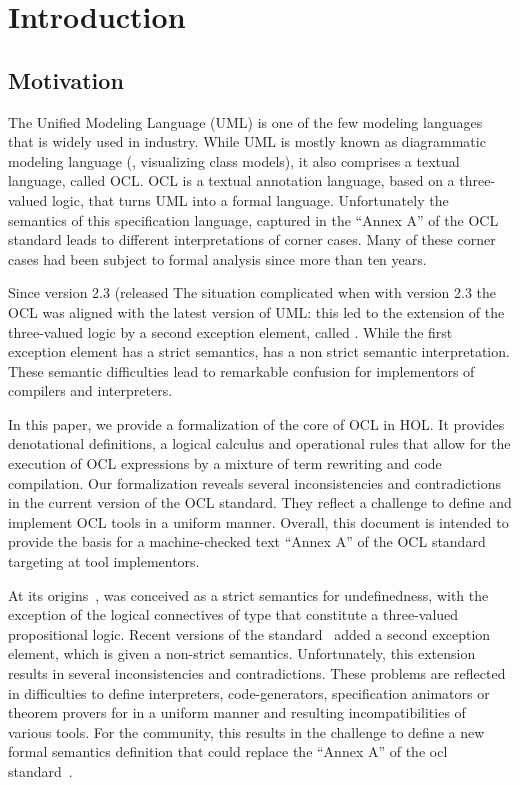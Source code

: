 \part{Introduction}
\chapter{Motivation}




  The Unified Modeling Language (UML) is one of the few modeling
  languages that is widely used in industry. While UML is mostly known
  as diagrammatic modeling language (\eg, visualizing class models),
  it also comprises a textual language, called OCL. OCL is a textual
  annotation language, based on a three-valued logic, that turns UML
  into a formal language.  Unfortunately the semantics of this
  specification language, captured in the ``Annex A'' of the OCL
  standard leads to different interpretations of corner cases.  Many
  of these corner cases had been subject to formal analysis since more
  than ten years.

  Since version 2.3 (released The situation complicated when with
  version 2.3 the OCL was aligned with the latest version of UML: this
  led to the extension of the three-valued logic by a second exception
  element, called .  While the first exception element
   has a strict semantics,  has a non
  strict semantic interpretation. These semantic difficulties lead to
  remarkable confusion for implementors of \OCL compilers and
  interpreters.

  In this paper, we provide a formalization of the core of OCL in
  HOL. It provides denotational definitions, a logical calculus and
  operational rules that allow for the execution of OCL expressions by
  a mixture of term rewriting and code compilation.  Our formalization
  reveals several inconsistencies and contradictions in the current
  version of the OCL standard.  They reflect a challenge to define and
  implement OCL tools in a uniform manner.  Overall, this document is
  intended to provide the basis for a machine-checked text ``Annex A''
  of the OCL standard targeting at tool implementors.


  \cite{brucker.ea:summary-aachen:2013}

  \cite{brucker.ea:semantic:2006-b}

At its origins~\cite{richters:precise:2002,omg:ocl:1997}, \OCL was
conceived as a strict semantics for undefinedness, with the exception
of the logical connectives of type  that constitute
a three-valued propositional logic.  Recent versions of the \OCL
standard~\cite{omg:ocl:2006,omg:ocl:2012} added a second exception
element, which is given a non-strict semantics.  Unfortunately, this
extension results in several inconsistencies and contradictions. These
problems are reflected in difficulties to define interpreters,
code-generators, specification animators or theorem provers for \OCL
in a uniform manner and resulting incompatibilities of various
tools. For the \OCL community, this results in the challenge to define
a new formal semantics definition \OCL that could replace the ``Annex
A'' of the \acs{ocl} standard~\cite{omg:ocl:2012}.


